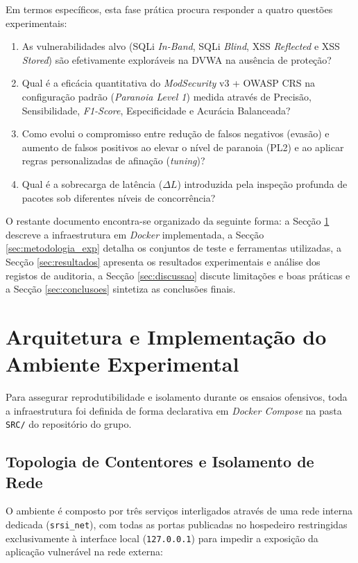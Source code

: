 \documentclass[11pt,a4paper]{article}
\begin{document}
Em termos específicos, esta fase prática procura responder a quatro questões experimentais:
\begin{enumerate}
    \item As vulnerabilidades alvo (SQLi \textit{In-Band}, SQLi \textit{Blind}, XSS \textit{Reflected} e XSS \textit{Stored}) são efetivamente exploráveis na DVWA na ausência de proteção?
    \item Qual é a eficácia quantitativa do \textit{ModSecurity} v3 + OWASP CRS na configuração padrão (\textit{Paranoia Level 1}) medida através de Precisão, Sensibilidade, \textit{F1-Score}, Especificidade e Acurácia Balanceada?
    \item Como evolui o compromisso entre redução de falsos negativos (evasão) e aumento de falsos positivos ao elevar o nível de paranoia (PL2) e ao aplicar regras personalizadas de afinação (\textit{tuning})?
    \item Qual é a sobrecarga de latência ($\Delta L$) introduzida pela inspeção profunda de pacotes sob diferentes níveis de concorrência?
\end{enumerate}

O restante documento encontra-se organizado da seguinte forma: a Secção \ref{sec:arquitetura} descreve a infraestrutura em \textit{Docker} implementada, a Secção \ref{sec:metodologia_exp} detalha os conjuntos de teste e ferramentas utilizadas, a Secção \ref{sec:resultados} apresenta os resultados experimentais e análise dos registos de auditoria, a Secção \ref{sec:discussao} discute limitações e boas práticas e a Secção \ref{sec:conclusoes} sintetiza as conclusões finais.

\clearpage
\section{Arquitetura e Implementação do Ambiente Experimental}
\label{sec:arquitetura}

Para assegurar reprodutibilidade e isolamento durante os ensaios ofensivos, toda a infraestrutura foi definida de forma declarativa em \textit{Docker Compose} na pasta \texttt{SRC/} do repositório do grupo.

\subsection{Topologia de Contentores e Isolamento de Rede}
O ambiente é composto por três serviços interligados através de uma rede interna dedicada (\texttt{srsi\_net}), com todas as portas publicadas no hospedeiro restringidas exclusivamente à interface local (\texttt{127.0.0.1}) para impedir a exposição da aplicação vulnerável na rede externa:
\end{document}
